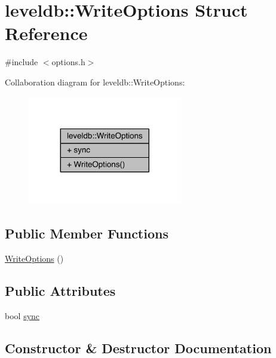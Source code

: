 \hypertarget{structleveldb_1_1_write_options}{}\section{leveldb\+:\+:Write\+Options Struct Reference}
\label{structleveldb_1_1_write_options}


{\ttfamily \#include $<$options.\+h$>$}



Collaboration diagram for leveldb\+:\+:Write\+Options\+:\nopagebreak
\begin{figure}[H]
\begin{center}
\leavevmode
\includegraphics[width=191pt]{structleveldb_1_1_write_options__coll__graph}
\end{center}
\end{figure}
\subsection*{Public Member Functions}
\begin{DoxyCompactItemize}
\item 
\hyperlink{structleveldb_1_1_write_options_a8cdd3e1a65d956d4bcb5e43fa9aee199}{Write\+Options} ()
\end{DoxyCompactItemize}
\subsection*{Public Attributes}
\begin{DoxyCompactItemize}
\item 
bool \hyperlink{structleveldb_1_1_write_options_a07cd165ae5ed59a763001286e14ba47e}{sync}
\end{DoxyCompactItemize}


\subsection{Constructor \& Destructor Documentation}
\hypertarget{structleveldb_1_1_write_options_a8cdd3e1a65d956d4bcb5e43fa9aee199}{}
